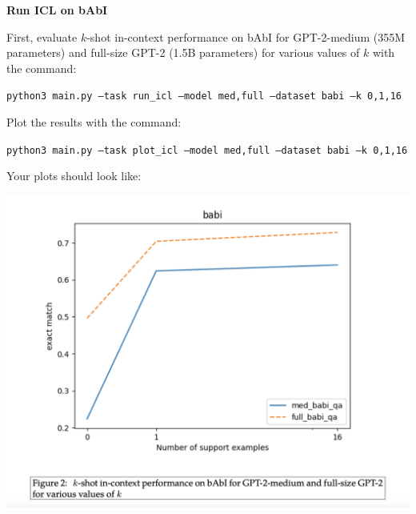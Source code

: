 \item {} {\bf Run ICL on bAbI}

First, evaluate $k$-shot in-context performance on bAbI for GPT-2-medium (355M parameters) and full-size GPT-2 (1.5B parameters) for various values of $k$ with the command:
    
\texttt{\small python3 main.py --task run\_icl --model med,full --dataset babi --k 0,1,16}

Plot the results with the command:

\texttt{\small python3 main.py --task plot\_icl --model med,full --dataset babi --k 0,1,16}

Your plots should look like:
\begin{center}
    \includegraphics[width=0.75\linewidth]{./figures/incontext-2b}
\end{center}
